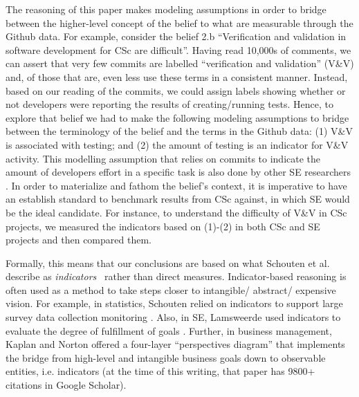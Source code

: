 \documentclass[conference,10pt]{IEEEtran}
\begin{document}
The reasoning of this 
paper makes
modeling assumptions in order to bridge between the higher-level concept of the belief to what are measurable through the Github data. For example, consider the belief 2.b ``Verification and validation in software development for CSc are difficult''.  
Having read 10,000s of comments, we can assert that 
very few commits are labelled  ``verification and validation'' (V\&V) and, of those that are,
even less use these terms in a consistent manner. Instead, based on our reading of the commits, we could assign labels showing whether or not developers were reporting the results of creating/running tests. Hence, to explore that belief we had to make the following modeling assumptions to bridge between the terminology of the belief and the terms in the Github data: (1) V\&V is associated with testing; and (2) the amount of testing is an indicator for V\&V activity. This modelling assumption that relies on commits to indicate the amount of developers effort in a specific  task is also done by other SE researchers \cite{vasilescu16_limit, xia2019sequential}. In order to materialize and fathom the belief's context, it is imperative to have an establish standard  to benchmark results from CSc against, in which SE would be the ideal candidate. For instance, to understand the difficulty of V\&V in CSc projects, we measured the indicators based on (1)-(2) in both CSc and SE projects and then compared them. 


Formally, this means that our conclusions are based on what
Schouten et al. describe as
 {\em indicators}~\cite{schouten2010indicators} rather than direct measures. Indicator-based reasoning is often used as a method to take steps closer to intangible/ abstract/ expensive vision. For example,
 in statistics, Schouten relied on indicators to support large survey data collection monitoring \cite{schouten2010indicators}. Also, in SE, Lamsweerde used indicators to evaluate the degree of fulfillment of goals \cite{vanLamsweerde2009_requirement}.
 Further, in business 
 management, Kaplan and Norton \cite{kaplan1996using} offered a four-layer ``perspectives diagram'' that implements the bridge from high-level and intangible business goals down
 to observable entities, i.e. indicators (at the time of this
 writing, that paper has  9800+ citations in Google Scholar).
   

\end{document}
